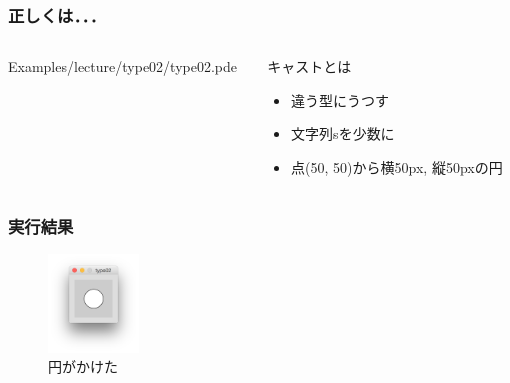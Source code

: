 \documentclass[10pt, dvipdfmx]{beamer}
\begin{document}
        \begin{frame}
            \frametitle{正しくは．．．}
            \begin{columns}[c]
                \begin{column}{0.50\textwidth}
                    \tiny
                    Examples/lecture/type02/type02.pde
                    \scriptsize
                \end{column}
                \begin{column}{0.50\textwidth}
                    \begin{block}{キャストとは}
                        \begin{itemize}
                            \item 違う型にうつす
                            \item 文字列sを少数に
                            \item 点(50, 50)から横50px, 縦50pxの円
                        \end{itemize}
                    \end{block}
                \end{column}
            \end{columns}
        \end{frame}

        \begin{frame}
            \frametitle{実行結果}
                \begin{figure}[htb]
                    \includegraphics[width=24mm]{images/11.png}
                    \caption{円がかけた}
                    \label{fig:11}
                \end{figure}
        \end{frame}
\end{document}
